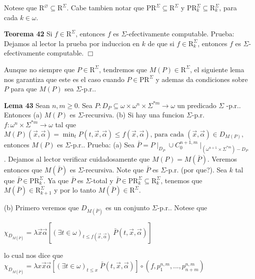 Notese que \(\mathrm{R}^{\varnothing }\subseteq \mathrm{R}^{\Sigma }\). Cabe tambien notar que \(\mathrm{PR}^{\Sigma }\subseteq \mathrm{R}^{\Sigma }\) y \( \mathrm{PR}_{k}^{\Sigma }\subseteq \mathrm{R}_{k}^{\Sigma }\), para cada \( k\in \omega \).



\textbf{Teorema 42} Si \(f\in \mathrm{R} ^{\Sigma }\), entonces \(f\) es \(\Sigma \)-efectivamente computable.
Prueba: Dejamos al lector la prueba por induccion en \(k\) de que si \(f\in \mathrm{R} _{k}^{\Sigma }\), entonces \(f\) es \(\Sigma \)-efectivamente computable. \(\Box\)

Aunque no siempre que \(P\in \mathrm{R}^{\Sigma }\), tendremos que \(M(P)\in \mathrm{R}^{\Sigma }\), el siguiente lema nos garantiza que este es el caso cuando \(P\in \mathrm{PR}^{\Sigma }\) y ademas da condiciones sobre \(P\) para que \(M(P)\) sea \(\Sigma \)-p.r..



\textbf{Lema 43} Sean \(n,m\geq 0\). Sea \(P:D_{P}\subseteq \omega \times \omega ^{n}\times \Sigma ^{\ast m}\rightarrow \omega \) un predicado \(\Sigma \) -p.r.. Entonces
(a) \(M(P)\) es \(\Sigma \)-recursiva.
(b) Si hay una funcion \(\Sigma \)-p.r. \(f:\omega ^{n}\times \Sigma ^{\ast m}\rightarrow \omega \) tal que
\(\displaystyle M(P)(\vec{x},\vec{\alpha})=\min_{t}P(t,\vec{x},\vec{\alpha})\leq f(\vec{x}, \vec{\alpha})\text{, para cada }(\vec{x},\vec{\alpha})\in D_{M(P)}\text{,} \)
entonces \(M(P)\) es \(\Sigma \)-p.r..
Prueba: (a) Sea \(\bar{P}=P\mid _{D_{P}}\cup C_{0}^{n+1,m}\mid _{(\omega ^{n+1}\times \Sigma ^{\ast m})-D_{P}}\). Dejamos al lector verificar cuidadosamente que \( M(P)=M(\bar{P})\). Veremos entonces que \(M(\bar{P})\) es \(\Sigma \)-recursiva. Note que \(\bar{P}\) es \(\Sigma \)-p.r. (por que?). Sea \(k\) tal que \(\bar{P}\in \mathrm{PR}_{k}^{\Sigma }\). Ya que \(\bar{P}\) es \(\Sigma \)-total y \(\bar{P} \in \mathrm{PR}_{k}^{\Sigma }\subseteq \mathrm{R}_{k}^{\Sigma }\), tenemos que \(M(\bar{P})\in \mathrm{R}_{k+1}^{\Sigma }\) y por lo tanto \(M(\bar{P})\in \mathrm{R}^{\Sigma }\).

(b) Primero veremos que \(D_{M(\bar{P})}\) es un conjunto \(\Sigma \)-p.r.. Notese que

\(\displaystyle \chi _{D_{M(\bar{P})}}=\lambda \vec{x}\vec{\alpha}\left[ (\exists t\in \omega )_{t\leq f(\vec{x},\vec{\alpha})}\;\bar{P}(t,\vec{x},\vec{\alpha}) \right] \)

lo cual nos dice que
\(\displaystyle \chi _{D_{M(\bar{P})}}=\lambda x\vec{x}\vec{\alpha}\left[ (\exists t\in \omega )_{t\leq x}\;\bar{P}(t,\vec{x},\vec{\alpha})\right] \circ (f,p_{1}^{n,m},...,p_{n+m}^{n,m}) \)

